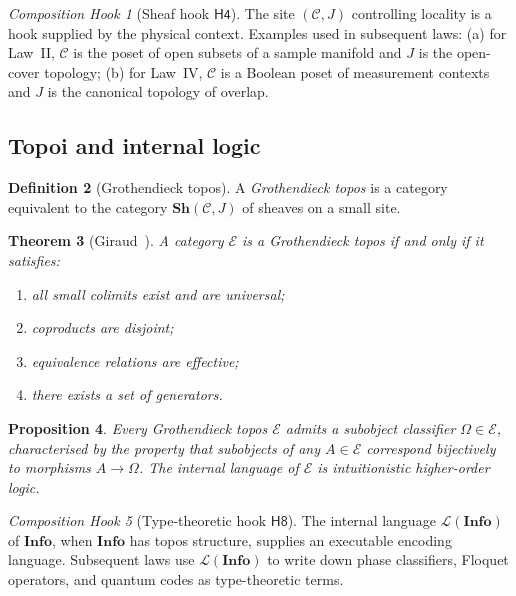 \documentclass[12pt]{article}
\newtheorem{theorem}{Theorem}[section]
\newtheorem{proposition}[theorem]{Proposition}
\theoremstyle{definition}
\newtheorem{definition}[theorem]{Definition}
\theoremstyle{remark}
\newtheorem{hook}[theorem]{Composition Hook}
\newcommand{\C}{\mathcal{C}}
\newcommand{\E}{\mathcal{E}}
\newcommand{\Info}{\mathbf{Info}}
\begin{document}
\begin{hook}[Sheaf hook $\mathsf{H4}$]
\label{hook:H4}
The site $(\C, J)$ controlling locality is a hook supplied by the physical context. Examples used in subsequent laws: (a) for Law~II, $\C$ is the poset of open subsets of a sample manifold and $J$ is the open-cover topology; (b) for Law~IV, $\C$ is a Boolean poset of measurement contexts and $J$ is the canonical topology of overlap.
\end{hook}

\subsection{Topoi and internal logic}

\begin{definition}[Grothendieck topos]
A \emph{Grothendieck topos} is a category equivalent to the category $\mathbf{Sh}(\C, J)$ of sheaves on a small site.
\end{definition}

\begin{theorem}[Giraud~\cite{maclane1998}]
\label{thm:giraud}
A category $\E$ is a Grothendieck topos if and only if it satisfies:
\begin{enumerate}
\item all small colimits exist and are universal;
\item coproducts are disjoint;
\item equivalence relations are effective;
\item there exists a set of generators.
\end{enumerate}
\end{theorem}

\begin{proposition}
Every Grothendieck topos $\E$ admits a \emph{subobject classifier} $\Omega \in \E$, characterised by the property that subobjects of any $A \in \E$ correspond bijectively to morphisms $A \to \Omega$. The internal language of $\E$ is intuitionistic higher-order logic.
\end{proposition}

\begin{hook}[Type-theoretic hook $\mathsf{H8}$]
\label{hook:H8}
The internal language $\mathcal{L}(\Info)$ of $\Info$, when $\Info$ has topos structure, supplies an executable encoding language. Subsequent laws use $\mathcal{L}(\Info)$ to write down phase classifiers, Floquet operators, and quantum codes as type-theoretic terms.
\end{hook}
\end{document}

